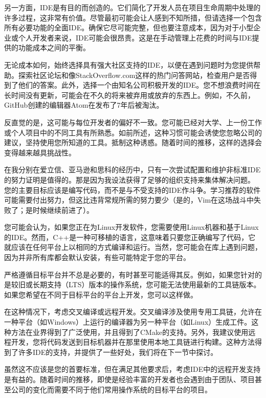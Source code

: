 另一方面，IDE是有目的而创造的。它们简化了开发人员在项目生命周期中处理的许多过程，这非常有价值。尽管最初可能会让人感到不知所措，但请选择一个包含所有必要功能的全面IDE。确保它尽可能完整，但也要注意成本，因为对于小型企业或个人开发者来说，IDE可能会很昂贵。这是在手动管理上花费的时间与IDE提供的功能成本之间的平衡。

无论成本如何，始终选择具有强大社区支持的IDE，以便在遇到问题时为您提供帮助。探索社区论坛和像StackOverflow.com这样的热门问答网站，检查用户是否得到了他们的答案。此外，选择一个由知名公司积极开发的IDE。您不想浪费时间在长时间没有更新，可能会在不久的将来被弃用或放弃的东西上。例如，不久前，GitHub创建的编辑器Atom在发布了7年后被淘汰。


反直觉的是，这可能与每位开发者的偏好不一致。您可能已经对大学、上一份工作或个人项目中的不同工具有所熟悉。如前所述，这种习惯可能会诱使您忽略公司的建议，坚持使用您所知道的工具。抵制这种诱惑。随着时间的推移，这样的选择会变得越来越具挑战性。

在我分别在爱立信、亚马逊和思科的经历中，只有一次尝试配置和维护非标准IDE的努力证明是值得的。那是因为我设法获得了足够的组织支持来集体解决问题。 您的主要目标应该是编写代码，而不是与不受支持的IDE作斗争。学习推荐的软件可能需要付出努力，但这比违背常规所需的努力要少（是的，Vim在这场战斗中失败了；是时候继续前进了）。


您可能会认为，如果您正在为Linux开发软件，您需要使用Linux机器和基于Linux的IDE。然而，C++是一种可移植的语言，这意味着只要您正确编写了代码，它就应该在任何平台上以相同的方式编译和运行。当然，您可能会在库上遇到问题，因为并非所有库都会默认安装，有些可能特定于您的平台。

严格遵循目标平台并不总是必要的，有时甚至可能适得其反。例如，如果您针对的是较旧或长期支持（LTS）版本的操作系统，您可能无法使用最新的工具链版本。如果您希望在不同于目标平台的平台上开发，您可以这样做。

在这种情况下，考虑交叉编译或远程开发。交叉编译涉及使用专用工具链，允许在一种平台（如Windows）上运行的编译器为另一种平台（如Linux）生成工件。这种方法在业界得到了广泛使用，并且得到了CMake的支持。另外，我建议使用远程开发，您将代码发送到目标机器并在那里使用本地工具链进行构建。这种方法得到了许多IDE的支持，并提供了一些好处，我们将在下一节中探讨。


虽然这不应该是您的首要标准，但在满足其他要求后，考虑IDE中的远程开发支持是有益的。随着时间的推移，即使是经验丰富的开发者也会遇到由于团队、项目甚至公司的变化而需要不同于他们常用操作系统的目标平台的项目。

